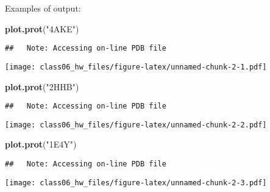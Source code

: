 \documentclass[
]{article}
\newenvironment{Shaded}{\begin{snugshade}}{\end{snugshade}}
\newcommand{\KeywordTok}[1]{\textcolor[rgb]{0.13,0.29,0.53}{\textbf{#1}}}
\newcommand{\NormalTok}[1]{#1}
\newcommand{\StringTok}[1]{\textcolor[rgb]{0.31,0.60,0.02}{#1}}
\begin{document}
Examples of output:

\begin{Shaded}
\begin{Highlighting}[]
\KeywordTok{plot.prot}\NormalTok{(}\StringTok{"4AKE"}\NormalTok{)}
\end{Highlighting}
\end{Shaded}

\begin{verbatim}
##   Note: Accessing on-line PDB file
\end{verbatim}

\texttt{[image: class06\_hw\_files/figure-latex/unnamed-chunk-2-1.pdf]}

\begin{Shaded}
\begin{Highlighting}[]
\KeywordTok{plot.prot}\NormalTok{(}\StringTok{"2HHB"}\NormalTok{)}
\end{Highlighting}
\end{Shaded}

\begin{verbatim}
##   Note: Accessing on-line PDB file
\end{verbatim}

\texttt{[image: class06\_hw\_files/figure-latex/unnamed-chunk-2-2.pdf]}

\begin{Shaded}
\begin{Highlighting}[]
\KeywordTok{plot.prot}\NormalTok{(}\StringTok{"1E4Y"}\NormalTok{)}
\end{Highlighting}
\end{Shaded}

\begin{verbatim}
##   Note: Accessing on-line PDB file
\end{verbatim}

\texttt{[image: class06\_hw\_files/figure-latex/unnamed-chunk-2-3.pdf]}
\end{document}
